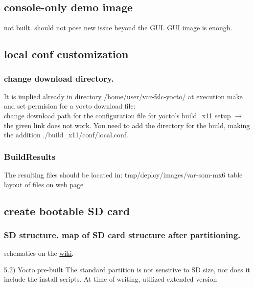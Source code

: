 \documentclass[10pt]{article}
\begin{document}
\subsection{ console-only demo image }
not built. should not pose new issue beyond the GUI. GUI image is enough.

\subsection{ local conf customization}

\subsubsection{ change download directory.}
It is implied already in directory /home/user/var-fslc-yocto/ at execution
make and set permision for a yocto download file:\\

change download path for the configuration file for yocto's build\_x11 setup $\rightarrow$ the given link does not work. You need to add the directory for the
build, making the addition ./build\_x11/conf/local.conf.


\subsubsection{ BuildResults }
The resulting files should be located in:  tmp/deploy/images/var-som-mx6
table layout of files on
\href{http://variwiki.com/index.php?title=Yocto_Build_Release&release=RELEASE_SUMO_V1.1_VAR-SOM-MX6#Build_Results}{web page}

\subsection{ create bootable SD card }

\subsubsection{ SD structure. map of SD card structure after partitioning.}
schematics on the \href{http://variwiki.com/index.php?title=Yocto_Build_Release&release=RELEASE_SUMO_V1.1_VAR-SOM-MX6#SD_card_structure}{wiki}.

5.2) Yocto pre-built
    The standard partition is not sensitive to SD size, nor does it include the install scripts. At time of writing, utilized extended version
\end{document}
